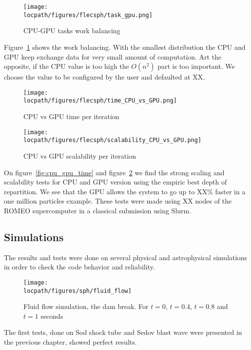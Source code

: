 \begin{figure}[t!]
\centering
\texttt{[image: \\locpath/figures/flecsph/task\_gpu.png]}
\caption{CPU-GPU tasks work balancing}
\label{fig:cpu_gpu_rep}
\end{figure}%

Figure~\ref{fig:cpu_gpu_rep} shows the work balancing. 
With the smallest distribution the CPU and GPU keep exchange data for very small amount of computation. 
Art the opposite, if the CPU value is too high the $O(n^2)$ part is too important. 
We choose the value to be configured by the user and defaulted at  XX.

\begin{figure}[t!]
\centering
\begin{minipage}[b]{.45\textwidth}
\centering
	\texttt{[image: \\locpath/figures/flecsph/time\_CPU\_vs\_GPU.png]}
	\caption{CPU vs GPU time per iteration}
	\label{fig:cpu_gpu_time}
\end{minipage}
\begin{minipage}[b]{.45\textwidth}
\centering
	\texttt{[image: \\locpath/figures/flecsph/scalability\_CPU\_vs\_GPU.png]}
	\caption{CPU vs GPU scalability per iteration}
	\label{fig:cpu_gpu_scala}
\end{minipage}
\end{figure}

On figure~\ref{fig:cpu_gpu_time} and figure~\ref{fig:cpu_gpu_scala} we find the strong scaling and scalability tests for CPU and GPU version using the empiric best depth of repartition.
We see that the GPU allows the system to go up to XX\% faster in a one million particles example. 
These tests were made using XX nodes of the ROMEO supercomputer in a classical submission using Slurm.

\subsection{Simulations}
The results and tests were done on several physical and astrophysical simulations in order to check the code behavior and reliability. 
\begin{figure}[t!]
\centering
\texttt{[image: \\locpath/figures/sph/fluid\_flow]}
\caption{Fluid flow simulation, the dam break. For $t=0$, $t=0.4$, $t=0.8$ and $t=1$ seconds}
\label{fig:fluid_simulation}
\end{figure}

The first tests, done on Sod shock tube and Sedov blast wave were presented in the previous chapter, showed perfect results. 

